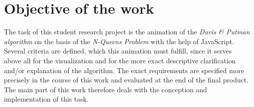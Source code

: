 \section{Objective of the work}
\label{sec:introObjective}
The task of this student research project is the animation of the \textit{Davis \& Putman algorithm} on the basis of the \textit{N-Queens Problem} with the help of JavaScript. Several criteria are defined, which this animation must fulfill, since it serves above all for the visualization and for the more exact descriptive clarification and/or explanation of the algorithm. The exact requirements are specified more precisely in the course of this work and evaluated at the end of the final product. The main part of this work therefore deals with the conception and implementation of this task.

